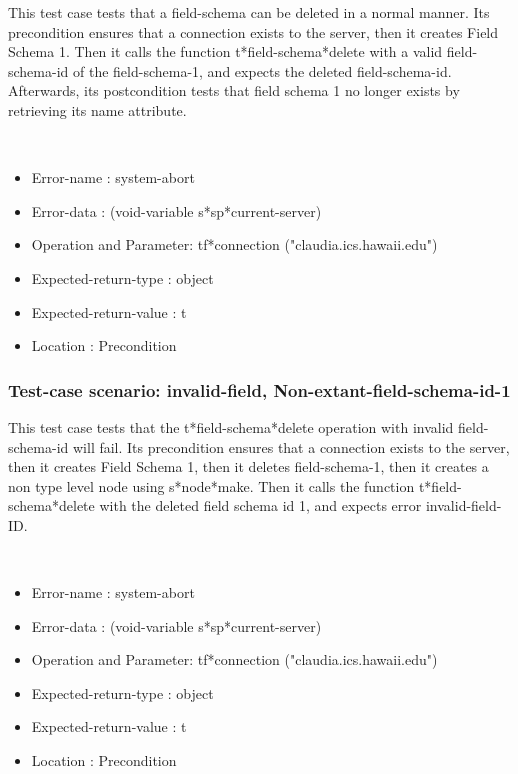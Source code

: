 This test case tests that a field-schema can be deleted in a normal manner.
Its precondition ensures that a connection exists to the server, then it creates Field Schema 1.
Then it calls the function t*field-schema*delete  with a valid field-schema-id of the field-schema-1, and expects the deleted field-schema-id.
Afterwards, its postcondition tests that field schema 1 no longer exists by retrieving its name attribute.


\
\begin {itemize}
\item 	Error-name             : system-abort
\item Error-data             : (void-variable s*sp*current-server)
\item Operation and Parameter: tf*connection ("claudia.ics.hawaii.edu")
\item Expected-return-type   : object
\item Expected-return-value  : t
\item Location               : Precondition



\end {itemize}
\subsubsection {Test-case scenario: invalid-field, Non-extant-field-schema-id-1}


This test case tests that the t*field-schema*delete operation with invalid field-schema-id will fail.
Its precondition ensures that a connection exists to the server, then it creates Field Schema 1, then it deletes field-schema-1, then it creates a non type level node using s*node*make.
Then it calls the function t*field-schema*delete  with the deleted field schema id 1, and expects error invalid-field-ID.



\
\begin {itemize}
\item 	Error-name             : system-abort
\item Error-data             : (void-variable s*sp*current-server)
\item Operation and Parameter: tf*connection ("claudia.ics.hawaii.edu")
\item Expected-return-type   : object
\item Expected-return-value  : t
\item Location               : Precondition



\end {itemize}
